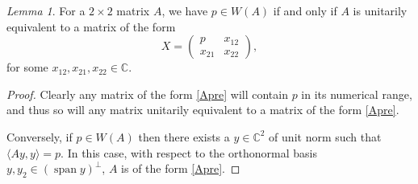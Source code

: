 \documentclass[12pt]{article}
\theoremstyle{plain}
\theoremstyle{definition}
\theoremstyle{remark}
\newtheorem{Lemma}[Theorem]{Lemma}
\numberwithin{equation}{section}
\begin{document}
























\begin{Lemma}\label{2.1}
    For a $2 \times 2$ matrix $A$, we have $p \in W(A) $ if and only if $A$ is unitarily equivalent to a matrix of the form \begin{equation}\label{Apre}
        X= \begin{pmatrix}
    p & x_{12} \\
    x_{21} & x_{22}
    \end{pmatrix},
    \end{equation}
for some $x_{12}, x_{21}, x_{22} \in \mathbb{C}$.
\end{Lemma}

\begin{proof}
    Clearly any matrix of the form \eqref{Apre} will contain $p$ in its numerical range, and thus so will any matrix unitarily equivalent to a matrix of the form \eqref{Apre}. 

    Conversely, if $p \in W(A) $ then there exists a $y \in \mathbb{C}^2$ of unit norm such that $\langle Ay , y \rangle  = p$. In this case, with respect to the orthonormal basis $y, y_2 \in (\operatorname{span}y)^{\perp}$, $A$ is of the form \eqref{Apre}.
\end{proof}
\end{document}
